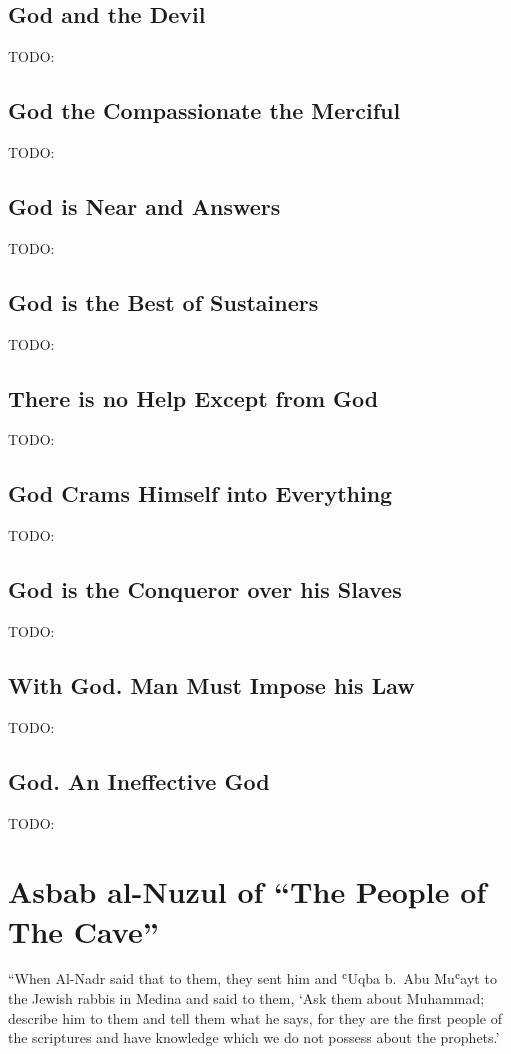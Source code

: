 \documentclass[12pt]{memoir}
\def\`{ʿ} %
\def\–{-\hskip0pt}
\begin{document}
\section{God and the Devil}
TODO:
\section{God the Compassionate the Merciful}
TODO:
\section{God is Near and Answers}
TODO:
\section{God is the Best of Sustainers}
TODO:
\section{There is no Help Except from God}
TODO:
\section{God Crams Himself into Everything}
TODO:
\section{God is the Conqueror over his Slaves}
TODO:
\section{With God. Man Must Impose his Law}
TODO:
\section{God. An Ineffective God}
TODO:

\clearpage
\appendix
\addappheadtotoc

\chapter{Asbab al\–Nuzul of “The People of The Cave”}
\label{apdx:cave}

“When Al\–Nadr said that to them, they sent him and \`Uqba b.\ Abu Mu\`ayt
to the Jewish rabbis in Medina and said to them, ‘Ask them about Muhammad;
describe him to them and tell them what he says,
for they are the first people of the scriptures
and have knowledge which we do not possess about the prophets.’
\end{document}
